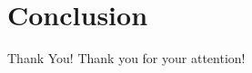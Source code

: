 \section{Conclusion}
\begin{frame}{Thank You!}
	\centering
	Thank you for your attention!
\end{frame}
